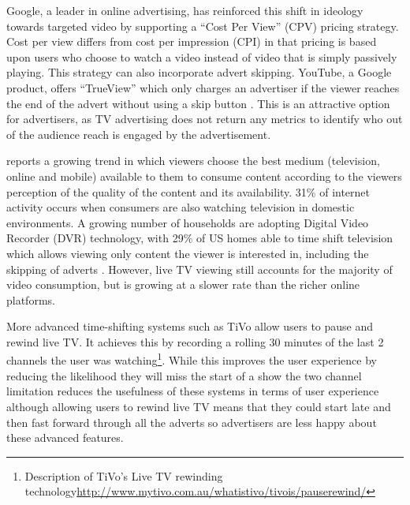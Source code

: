 
	Google, a leader in online advertising, has reinforced this shift in ideology towards targeted video by supporting a ``Cost Per View'' (CPV) pricing strategy. Cost per view differs from cost per impression (CPI) in that pricing is based upon users who choose to watch a video instead of video that is simply passively playing. This strategy can also incorporate advert skipping. YouTube, a Google product, offers ``TrueView'' which only charges an advertiser if the viewer reaches the end of the advert without using a skip button \citep{trueview}. This is an attractive option for advertisers, as TV advertising does not return any metrics to identify who out of the audience reach is engaged by the advertisement.

	\citet{three-screen} reports a growing trend in which viewers choose the best medium (television, online and mobile) available to them to consume content according to the viewers perception of the quality of the content and its availability. 31\% of internet activity occurs when consumers are also watching television in domestic environments. A growing number of households are adopting Digital Video Recorder (DVR) technology, with 29\% of US homes able to time shift television which allows viewing only content the viewer is interested in, including the skipping of adverts \citep{gal2006targeted}. However, live TV viewing still accounts for the majority of video consumption, but is growing at a slower rate than the richer online platforms.

	More advanced time-shifting systems such as TiVo allow users to pause and rewind live TV. It achieves this by recording a rolling 30 minutes of the last 2 channels the user was watching\footnote{Description of TiVo's Live TV rewinding technology\url{http://www.mytivo.com.au/whatistivo/tivois/pauserewind/}}. While this improves the user experience by reducing the likelihood they will miss the start of a show the two channel limitation reduces the usefulness of these systems in terms of user experience although allowing users to rewind live TV means that they could start late and then fast forward through all the adverts so advertisers are less happy about these advanced features.

